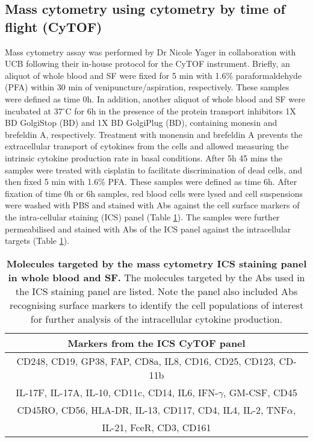 \subsection{Mass cytometry using cytometry by time of flight (CyTOF)}
Mass cytometry assay was performed by Dr Nicole Yager in collaboration with UCB following their in-house protocol for the CyTOF instrument. Briefly, an aliquot of whole blood and SF were fixed for 5 min with 1.6\% paraformaldehyde (PFA) within 30 min of venipuncture/aspiration, respectively. These samples were defined as time 0h. In addition, another aliquot of whole blood and SF were incubated at 37{$^\circ$}C for 6h in the presence of the protein transport inhibitors 1X BD GolgiStop (BD) and 1X BD GolgiPlug (BD), containing monesin and brefeldin A, respectively. Treatment with monensin and brefeldin A prevents the extracellular transport of cytokines from the cells and allowed measuring the intrinsic cytokine production rate in basal conditions. After 5h 45 mins the samples were treated with cisplatin to facilitate discrimination of dead cells, and then fixed 5 min with 1.6\% PFA. These samples were defined as time 6h. After fixation of time 0h or 6h samples, red blood cells were lysed and cell suspensions were washed with PBS and stained with Abs against the cell surface markers of the intra-cellular staining (ICS) panel (Table \ref{tab:CyTOF}). The samples were further permeabilised and stained with Abs of the ICS panel against the intracellular targets (Table \ref{tab:CyTOF}). 



\begin{table}[htbp]
\setlength{\tabcolsep}{20pt}
\renewcommand{\arraystretch}{1.5}
\begin{tabular}{@{} c}
\toprule
\textbf{Markers from the ICS CyTOF panel} \\
\midrule
\midrule
CD248, CD19, GP38, FAP, CD8a, IL8, CD16, CD25, CD123, CD-11b \\
IL-17F, IL-17A, IL-10, CD11c, CD14, IL6, IFN-$\gamma$, GM-CSF, CD45\\
CD45RO, CD56, HLA-DR, IL-13, CD117, CD4, IL4, IL-2, TNF$\alpha$,\\
IL-21, FceR, CD3, CD161\\
\bottomrule
\end{tabular}
\medskip %
\caption[Molecules targeted by the mass cytometry ICS staining panel in whole blood and SF.]{\textbf{Molecules targeted by the mass cytometry ICS staining panel in whole blood and SF.} The molecules targeted by the Abs used in the ICS staining panel are listed. Note the panel also included Abs recognising surface markers to identify the cell populations of interest for further analysis of the intracellular cytokine production.}
\label{tab:CyTOF}
\end{table}
\bigskip %





